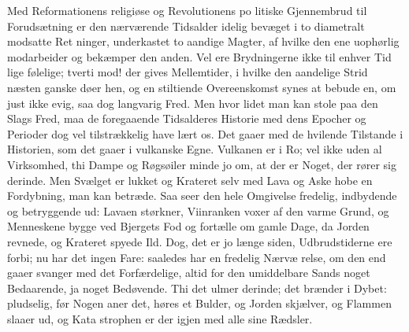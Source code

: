 \documentclass[12pt]{book}
\newcommand{\opage}[1]{\marginnote{\footnotesize\textit{[#1]}}}
\begin{document}
Med Reformationens religiøse og Revolutionens po\-%
litiske Gjennembrud til Forudsætning er den nærværende
Tidsalder idelig bevæget i to diametralt modsatte Ret\-%
ninger, underkastet to aandige Magter, af hvilke den ene
uophørlig modarbeider og bekæmper den anden. Vel
ere Brydningerne ikke til enhver Tid lige følelige; tverti\-%
mod! der gives Mellemtider, i hvilke den aandelige Strid
næsten ganske døer hen, og en stiltiende Overeenskomst
synes at bebude en, om just ikke evig, saa dog langvarig
Fred. Men hvor lidet man kan stole paa den Slags
Fred, maa de foregaaende Tidsalderes Historie med dens
Epocher og Perioder dog vel tilstrækkelig have lært os.
Det gaaer med de hvilende Tilstande i Historien, som
det gaaer i vulkanske Egne. Vulkanen er i Ro; vel
ikke uden al Virksomhed, thi Dampe og Røgsøiler minde
jo om, at der er Noget, der rører sig derinde. Men
Svælget er lukket og Krateret selv med Lava og Aske\-%
hobe en Fordybning, man kan betræde. Saa seer den
hele Omgivelse fredelig, indbydende og betryggende ud:
Lavaen størkner, Viinranken voxer af den varme Grund,
og Menneskene bygge ved Bjergets Fod og fortælle om
gamle Dage, da Jorden revnede, og Krateret spyede Ild.
Dog, det er jo længe siden, Udbrudstiderne ere forbi;
nu har det ingen Fare: saaledes har en fredelig Nærvæ\-%
relse, om den end gaaer svanger med det Forfærdelige,
altid for den umiddelbare Sands noget Bedaarende, ja
noget Bedøvende. Thi det ulmer derinde; det brænder
\opage{38}\setcounter{footnote}{0}%
i Dybet: pludselig, før Nogen aner det, høres et Bulder,
og Jorden skjælver, og Flammen slaaer ud, og Kata\-%
strophen er der igjen med alle sine Rædsler.
\end{document}
